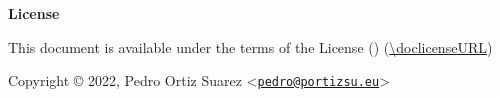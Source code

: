 \newpage  %
\thispagestyle{empty}
\begin{center}
	{\Huge\bfseries License}

	\vfill
	\Large
	This document is available under the terms of the \doclicenseLongName License (\doclicenseName) (\url{\doclicenseURL})

	\vfill
	Copyright © 2022, Pedro Ortiz Suarez <\href{mailto:pedro@portizsu.eu}{\nolinkurl{pedro@portizsu.eu}}>

	\vfill
	\doclicenseImage
\end{center}

\vfill